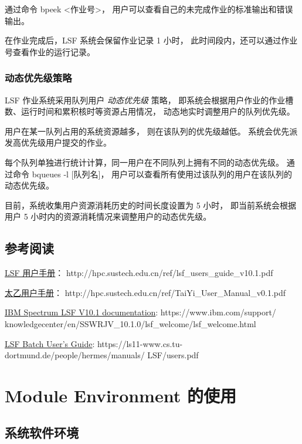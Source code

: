 \documentclass[UTF8]{ctexart}
\newcommand{\myem}[1]{{\color{red}\em #1}}
\newcommand{\mynnote}[1]{\colorbox{gray!15}{\color{blue!65}#1}}
\begin{document}
通过命令 \mynnote{bpeek <作业号>}，
用户可以查看自己的未完成作业的标准输出和错误输出。

在作业完成后，LSF 系统会保留作业记录 1 小时，
此时间段内，还可以通过作业号查看作业的运行记录。

\subsubsection{动态优先级策略}
LSF 作业系统采用队列用户 \myem{动态优先级} 策略，
即系统会根据用户作业的作业槽数、运行时间和累积核时等资源占用情况，
动态地实时调整用户的队列优先级。

用户在某一队列占用的系统资源越多，
则在该队列的优先级越低。
系统会优先派发高优先级用户提交的作业。

每个队列单独进行统计计算，同一用户在不同队列上拥有不同的动态优先级。
通过命令 \mynnote{bqueues -l [队列名]}，
用户可以查看所有使用过该队列的用户在该队列的动态优先级。

目前，系统收集用户资源消耗历史的时间长度设置为 5 小时，
即当前系统会根据用户 5 小时内的资源消耗情况来调整用户的动态优先级。

\subsection{参考阅读}
\href{http://hpc.sustech.edu.cn/ref/lsf_users_guide_v10.1.pdf}{LSF 用户手册}：
http://hpc.sustech.edu.cn/ref/lsf\_users\_guide\_v10.1.pdf

\href{http://hpc.sustech.edu.cn/ref/TaiYi_User_Manual_v0.1.pdf}{太乙用户手册}：
http://hpc.sustech.edu.cn/ref/TaiYi\_User\_Manual\_v0.1.pdf

\href{https://www.ibm.com/support/knowledgecenter/en/SSWRJV_10.1.0/lsf_welcome/lsf_welcome.html}{IBM Spectrum LSF V10.1 documentation}:
https://www.ibm.com/support/\newline
knowledgecenter/en/SSWRJV\_10.1.0/lsf\_welcome/lsf\_welcome.html

\href{https://ls11-www.cs.tu-dortmund.de/people/hermes/manuals/LSF/users.pdf}{LSF Batch User's Guide}:
https://ls11-www.cs.tu-dortmund.de/people/hermes/manuals/\newline
LSF/users.pdf

\section{Module Environment 的使用}
\subsection{系统软件环境}
\end{document}
